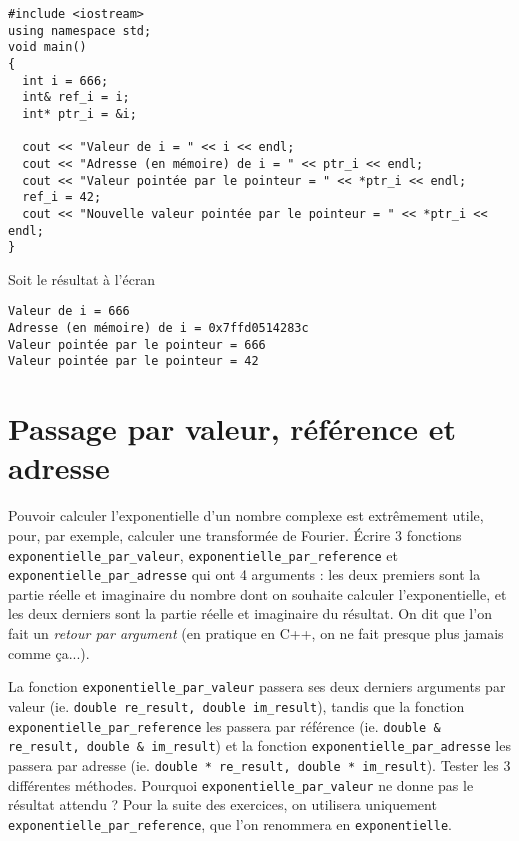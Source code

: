 \documentclass{book}
\newcommand{\inline}[1]{\texttt{#1}}
\begin{document}
\begin{correction}

\begin{verbatim}
#include <iostream>
using namespace std;
void main()
{
  int i = 666;
  int& ref_i = i;
  int* ptr_i = &i;

  cout << "Valeur de i = " << i << endl;
  cout << "Adresse (en mémoire) de i = " << ptr_i << endl;
  cout << "Valeur pointée par le pointeur = " << *ptr_i << endl;
  ref_i = 42;
  cout << "Nouvelle valeur pointée par le pointeur = " << *ptr_i << endl;
}
\end{verbatim}

Soit le résultat à l'écran

\begin{verbatim}
Valeur de i = 666
Adresse (en mémoire) de i = 0x7ffd0514283c
Valeur pointée par le pointeur = 666
Valeur pointée par le pointeur = 42
\end{verbatim}
\end{correction}


\section{Passage par valeur, référence et adresse} \label{ex:exp}

Pouvoir calculer l'exponentielle d'un nombre complexe est extrêmement utile, pour, par exemple, calculer une transformée de Fourier. Écrire 3 fonctions \inline{exponentielle_par_valeur}, \inline{exponentielle_par_reference} et \inline{exponentielle_par_adresse} qui ont 4 arguments : les deux premiers sont la partie réelle et imaginaire du nombre dont on souhaite calculer l'exponentielle, et les deux derniers sont la partie réelle et imaginaire du résultat. On dit que l'on fait un \textit{retour par argument} (en pratique en C++, on ne fait presque plus jamais comme ça...).

La fonction \inline{exponentielle_par_valeur} passera ses deux derniers arguments par valeur (ie. \inline{double re_result, double im_result}), tandis que la fonction \inline{exponentielle_par_reference} les passera par référence (ie. \inline{double & re_result, double & im_result}) et la fonction \inline{exponentielle_par_adresse} les passera par adresse (ie. \inline{double * re_result, double * im_result}). Tester les 3 différentes méthodes. Pourquoi \inline{exponentielle_par_valeur} ne donne pas le résultat attendu ? Pour la suite des exercices, on utilisera uniquement \inline{exponentielle_par_reference}, que l'on renommera en \inline{exponentielle}.
\end{document}
